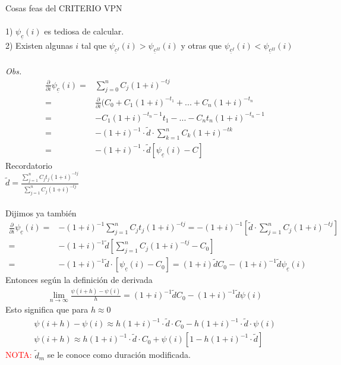 Cosas feas del CRITERIO VPN\\ \\
1) $\psi_{\underline{c}}(i)$ es tediosa de calcular. \\
2) Existen algunas $i$ tal que $\psi_{\underline{c}^{I}}(i)>\psi_{\underline{c}^{II}}(i)$ y otras que $\psi_{\underline{c}^{I}}(i)<\psi_{\underline{c}^{II}}(i)$\\ \\
\textit{Obs.}
\begin{align*}
    \frac{\partial}{\partial i} \psi_{\underline{c}}(i) = & \sum_{j=0}^{n} C_j(1+i)^{-tj}\\
    =&\frac{\partial}{\partial i}(C_0 + C_1 (1+i)^{-t_1}+...+ C_n(1+i)^{-t_n}\\
    =& -C_1(1+i)^{-t_n-1}t_1-...-C_nt_n(1+i)^{-t_n-1}\\
    =& -(1+i)^{-1}\cdot\tilde{d}\cdot\sum_{k=1}^{n}C_k(1+i)^{-tk}\\
    =& -(1+i)^{-1}\cdot\tilde{d}[\psi_{\underline{c}}(i)-C]
\end{align*}
\newpage
Recordatorio \\
$\tilde{d} = \frac{\sum_{j=1}^{n}C_j t_j(1+i)^{-tj}}{\sum_{j=1}^{n}C_j(1+i)^{-tj}}$\\ \\
Dijimos ya también
\begin{align*}
    \frac{\partial}{\partial i}\psi_{\underline{c}}(i) = & -(1+i)^{-1}\sum_{j=1}^{n}C_j t_j (1+i)^{-tj} = -(1+i)^{-1}[\tilde{d}\cdot\sum_{j=1}^{n}C_j(1+i)^{-tj}]\\
    =& -(1+i)^{-1}\tilde{d}[\sum_{j=1}^{n}C_j(1+i)^{-tj}-C_0]\\
    =& -(1+i)^{-1}\tilde{d}\cdot[\psi_{\underline{c}}(i)-C_0]= (1+i)\tilde{d}C_0-(1+i)^{-1}\tilde{d}\psi_{\underline{c}}(i)
\end{align*}
Entonces según la definición de derivada
\begin{align*}
\lim_{n \to \infty}\frac{\psi(i+h)-\psi(i)}{h}=(1+i)^{-1}\tilde{d}C_0-(1+i)^{-1}\tilde{d}\psi(i)
\end{align*}
Esto significa que para $h\approx0$
\begin{align*}
    \psi(i+h) -\psi(i) \approx h(1+i)^{-1}\cdot\tilde{d}\cdot C_0 - h(1+i)^{-1}\cdot\tilde{d}\cdot\psi(i)\\
    \psi(i+h) \approx h(1+i)^{-1}\cdot\tilde{d}\cdot C_0 + \psi(i)[1-h(1+i)^{-1}\cdot \tilde{d}] 
\end{align*}
\textcolor{red}{NOTA:} $\tilde{d}_m$ se le conoce como duración modificada.\\
